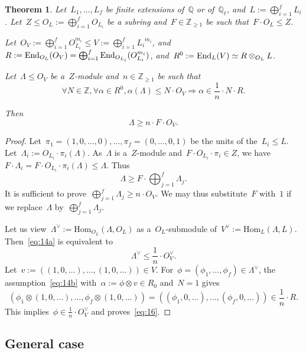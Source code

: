 \documentclass[12pt]{amsart}
\newtheorem{theorem}{Theorem}[section]
\newcommand{\Hom}{\mbox{Hom}}
\newcommand{\End}{{\rm End}}
\newcommand{\Z}{{\mathbb Z}}
\newcommand{\Q}{{\mathbb Q}}
\newcommand{\tens}{\otimes}
\begin{document}
\begin{theorem}\label{thm:C}
Let~$L_1,\ldots,L_f$ be finite extensions of~$\Q$ or of~$\Q_\ell$, and~$L:=\bigoplus_{i=1}^f L_i$. Let~$Z\leq O_L:=\bigoplus_{i=1}^f O_{L_i}$ be a subring and~$F\in\Z_{\geq1}$ be such that~$F\cdot O_L\leq Z$. 

Let~$O_V:=\bigoplus_{i=1}^f O_{L_i}^{m_i}\leq V:=\bigoplus_{i=1}^f {L_i}^{m_i}$, and~$R:=\End_{O_L}(O_V)=\bigoplus_{i=1}^f \End_{O_{L_i}}(O_{L_i}^{m_i})$, and~$R^0:=\End_{L}(V)\simeq R\tens_{O_L}L$.

Let~$\Lambda\leq O_V$ be a~$Z$-module and~$n\in\Z_{\geq1}$ be such that
\begin{equation}\label{eq:14b}
\forall N\in \Z, \forall \alpha\in R^0, \alpha(\Lambda)\leq N\cdot  O_V\Rightarrow \alpha\in \frac{1}{n}\cdot N\cdot R. 
\end{equation}

Then
\begin{equation}\label{eq:14a}
\Lambda\geq n\cdot F\cdot O_V.
\end{equation}
\end{theorem}
\begin{proof} Let~$\pi_1=(1,0,\ldots,0),\ldots,\pi_f=(0,\ldots,0,1)$ be the units of the~$L_i\leq L$. Let~$\Lambda_i:=O_{L_i}\cdot \pi_i(\Lambda)$. As~$\Lambda$ is a~$Z$-module and~$F\cdot O_{L_i}\cdot \pi_i\in Z$, we have~$F\cdot \Lambda_i=F\cdot O_{L_i}\cdot \pi_i(\Lambda)\leq \Lambda$. Thus
\[
\Lambda\geq F\cdot \bigoplus_{j=1}^f \Lambda_j.
\]
It is sufficient to prove~$\bigoplus_{j=1}^f \Lambda_j\geq  n\cdot O_V.$
We may thus substitute~$F$ with~$1$ if we replace~$\Lambda$ by~$\bigoplus_{j=1}^f \Lambda_j$.

Let us view~$\Lambda^\vee:=\Hom_{O_L}(\Lambda,O_L)$ as a~$O_L$-submodule of~$V^\vee:=\Hom_{L}(\Lambda,L)$. Then~\eqref{eq:14a} is equivalent to
\begin{equation}\label{eq:16}
\Lambda^{\vee}\leq \frac{1}{n}\cdot O^\vee_V.
\end{equation}
Let~$v:=((1,0,\ldots),\ldots,(1,0,\ldots))\in V$. For~$\phi=(\phi_1,\ldots,\phi_f)\in \Lambda^\vee$, the assumption~\eqref{eq:14b} with~$\alpha:=\phi\tens v\in R_0$ and~$N=1$ gives
\[
(\phi_1\tens(1,0,\ldots),\ldots,\phi_f\tens(1,0,\ldots))
=((\phi_1,0,\ldots),\ldots,(\phi_f,0,\ldots))
  \in \frac{1}{n}\cdot R.
\]
This implies~$\phi\in \frac{1}{n}\cdot O_V^\vee$ and proves~\eqref{eq:16}.
\end{proof}
\subsection{General case}\label{app:D}
\end{document}
